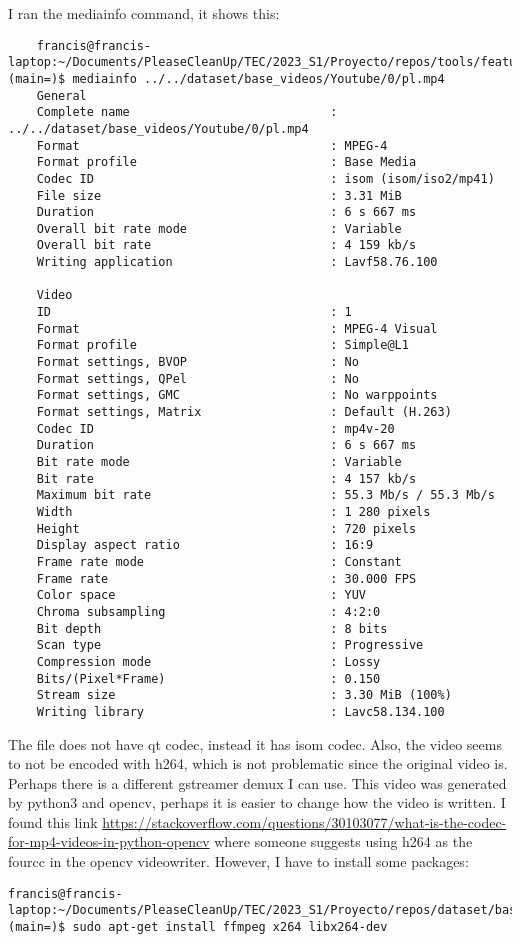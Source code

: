 \documentclass[12pt,oneside]{book}
\begin{document}
  I ran the mediainfo command, it shows this:
  \begin{lstlisting}
    francis@francis-laptop:~/Documents/PleaseCleanUp/TEC/2023_S1/Proyecto/repos/tools/feature_generator (main=)$ mediainfo ../../dataset/base_videos/Youtube/0/pl.mp4 
    General
    Complete name                            : ../../dataset/base_videos/Youtube/0/pl.mp4
    Format                                   : MPEG-4
    Format profile                           : Base Media
    Codec ID                                 : isom (isom/iso2/mp41)
    File size                                : 3.31 MiB
    Duration                                 : 6 s 667 ms
    Overall bit rate mode                    : Variable
    Overall bit rate                         : 4 159 kb/s
    Writing application                      : Lavf58.76.100
    
    Video
    ID                                       : 1
    Format                                   : MPEG-4 Visual
    Format profile                           : Simple@L1
    Format settings, BVOP                    : No
    Format settings, QPel                    : No
    Format settings, GMC                     : No warppoints
    Format settings, Matrix                  : Default (H.263)
    Codec ID                                 : mp4v-20
    Duration                                 : 6 s 667 ms
    Bit rate mode                            : Variable
    Bit rate                                 : 4 157 kb/s
    Maximum bit rate                         : 55.3 Mb/s / 55.3 Mb/s
    Width                                    : 1 280 pixels
    Height                                   : 720 pixels
    Display aspect ratio                     : 16:9
    Frame rate mode                          : Constant
    Frame rate                               : 30.000 FPS
    Color space                              : YUV
    Chroma subsampling                       : 4:2:0
    Bit depth                                : 8 bits
    Scan type                                : Progressive
    Compression mode                         : Lossy
    Bits/(Pixel*Frame)                       : 0.150
    Stream size                              : 3.30 MiB (100%)
    Writing library                          : Lavc58.134.100\end{lstlisting}

  The file does not have qt codec, instead it has isom codec. Also, the video seems to not be encoded with h264, which is not problematic since the original video is. Perhaps there is a different gstreamer demux I can use.
  This video was generated by python3 and opencv, perhaps it is easier to change how the video is written.
  I found this link \url{https://stackoverflow.com/questions/30103077/what-is-the-codec-for-mp4-videos-in-python-opencv} where someone suggests using h264 as the fourcc in the opencv videowriter. However, I have to install some packages:
  \begin{lstlisting}
francis@francis-laptop:~/Documents/PleaseCleanUp/TEC/2023_S1/Proyecto/repos/dataset/base_videos/Youtube (main=)$ sudo apt-get install ffmpeg x264 libx264-dev
  \end{lstlisting}

  \printbibliography[title={Bibliografía},heading=bibintoc]
\end{document}
